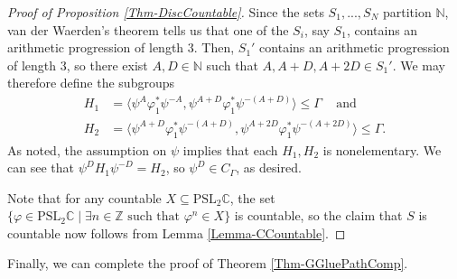\documentclass[11pt,leqno]{article}
\theoremstyle{introdef}
\numberwithin{lemma}{section}
\theoremstyle{definition}
\newcommand{\Z}{\mathbb{Z}}
\newcommand{\C}{\mathbb{C}}
\newcommand{\N}{\mathbb{N}}
\begin{document}
\begin{proof}[Proof of Proposition \ref{Thm-DiscCountable}]
    Since the sets $S_1,...,S_N$ partition $\N$, van der Waerden's theorem \cite{VAN} tells us that one of the $S_i$, say $S_1$, contains an arithmetic progression of length $3$. Then, $S_1'$ contains an arithmetic progression of length $3$, so there exist $A,D\in\N$ such that $A,A+D,A+2D\in S_1'$. We may therefore define the subgroups
    \begin{equation*} 
        \begin{split}
            H_1 &= \langle\psi^A\varphi_1^*\psi^{-A},\psi^{A+D}\varphi_1^*\psi^{-(A+D)}\rangle\leq\Gamma \;\;\;\text{ and}\\
            H_2 &= \langle\psi^{A+D}\varphi_1^*\psi^{-(A+D)},\psi^{A+2D}\varphi_1^*\psi^{-(A+2D)}\rangle\leq\Gamma.
        \end{split}
    \end{equation*}
    As noted, the assumption on $\psi$ implies that each $H_1,H_2$ is nonelementary. We can see that $\psi^DH_1\psi^{-D}=H_2$, so $\psi^D\in C_\Gamma$, as desired.\par

    Note that for any countable $X\subseteq\mathrm{PSL}_2\C$, the set $\{\varphi\in\mathrm{PSL}_2\C \;|\; \exists n\in\Z \text{ such that }\varphi^n\in X\}$ is countable, so the claim that $S$ is countable now follows from Lemma \ref{Lemma-CCountable}.
\end{proof}

Finally, we can complete the proof of Theorem \ref{Thm-GGluePathComp}.
\end{document}
